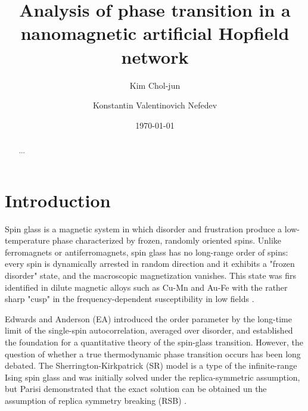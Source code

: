 \documentclass[
    aps,
    prb,
    reprint,           %
    superscriptaddress,%
    amsmath,amssymb,
    floatfix
]{revtex4-2}
\begin{document}
\title{Analysis of phase transition in a nanomagnetic artificial Hopfield network}

\author{Kim Chol-jun}

\author{Konstantin Valentinovich Nefedev}


\date{\today}

\begin{abstract}
...
\end{abstract}


\maketitle

\section{Introduction}
\label{sec:intro}
Spin glass is a magnetic system in which disorder and frustration produce a low-temperature phase characterized by frozen, randomly oriented spins. Unlike ferromagnets or antiferromagnets, spin glass has no long-range order of spins: every spin is dynamically arrested in random direction and it exhibits a "frozen disorder" state, and the macroscopic magnetization vanishes. This state was firs identified in dilute magnetic alloys such as Cu-Mn and Au-Fe with the rather sharp "cusp" in the frequency-dependent susceptibility in low fields \cite{Cannella1972}.

Edwards and Anderson (EA) \cite{EA1975} introduced the order parameter by the long-time limit of the single-spin autocorrelation, averaged over disorder, and established the foundation for a quantitative theory of the spin-glass transition. However, the question of whether a true thermodynamic phase transition occurs has been long debated. The Sherrington-Kirkpatrick (SR) model is a type of the infinite-range Ising spin glass and was initially solved under the replica-symmetric assumption, but Parisi demonstrated that the exact solution can be obtained un the assumption of replica symmetry breaking (RSB) \cite{Parisi1979,Parisi1983}. 
\end{document}

